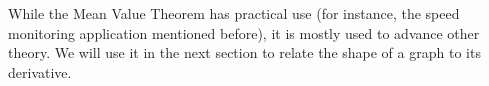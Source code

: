 While the Mean Value Theorem has practical use (for instance, the speed monitoring application mentioned before), it is mostly used to advance other theory. We will use it in the next section to relate  the shape of a graph to its derivative.

%

